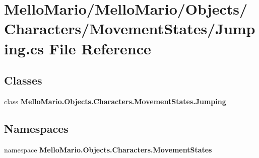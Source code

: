 \section{Mello\+Mario/\+Mello\+Mario/\+Objects/\+Characters/\+Movement\+States/\+Jumping.cs File Reference}
\label{Jumping_8cs}
\subsection*{Classes}
\begin{DoxyCompactItemize}
\item 
class \textbf{ Mello\+Mario.\+Objects.\+Characters.\+Movement\+States.\+Jumping}
\end{DoxyCompactItemize}
\subsection*{Namespaces}
\begin{DoxyCompactItemize}
\item 
namespace \textbf{ Mello\+Mario.\+Objects.\+Characters.\+Movement\+States}
\end{DoxyCompactItemize}
